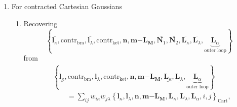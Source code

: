 \documentclass[a4paper,11pt,twoside,openright]{book}
\begin{document}
\begin{enumerate}
\begin{enumerate}
\[          \overline{\boldsymbol{l}_{\lambda}\mathrm{+}\boldsymbol{L}_{\lambda}},%
          \boldsymbol{n},\boldsymbol{m}\mathrm{-}\boldsymbol{L}_{\boldsymbol{M}},%
          \boldsymbol{N}_{1},\boldsymbol{N}_{2},%
          \underbrace{\boldsymbol{L}_{\alpha},i,j}_{\text{outer loop}}\right\}_{\text{Herm}},
        \]
      \item Recovering
        \[
          \left\{\overline{\boldsymbol{l}_{\kappa}},\overline{\boldsymbol{l}_{\lambda}},%
          \boldsymbol{n},\boldsymbol{m}\mathrm{-}\boldsymbol{L}_{\boldsymbol{M}},%
          \overline{\boldsymbol{N}_{1}},\overline{\boldsymbol{N}_{2}},%
          \underbrace{\boldsymbol{L}_{\alpha},i,j}_{\text{outer loop}}\right\}_{\text{Herm}}
        \]
        from
        \[
          \left\{\underline{\boldsymbol{l}_{\kappa}},\underline{\boldsymbol{l}_{\lambda}},%
          \boldsymbol{n},\boldsymbol{m}\mathrm{-}\boldsymbol{L}_{\boldsymbol{M}},%
          \underbrace{\boldsymbol{L}_{\alpha},i,j}_{\text{outer loop}}\right\}_{\text{Herm}};
        \]
    \end{enumerate}
%
  \item For contracted Cartesian Gaussians
    \begin{enumerate}
      \item Recovering
        \[
          \left\{\overline{\boldsymbol{l}_{\kappa}},\text{contr}_{\text{bra}},%
          \overline{\boldsymbol{l}_{\lambda}},\text{contr}_{\text{ket}},%
          \boldsymbol{n},\boldsymbol{m}\mathrm{-}\boldsymbol{L}_{\boldsymbol{M}},%
          \overline{\boldsymbol{N}_{1}},\overline{\boldsymbol{N}_{2}},%
          \overline{\boldsymbol{L}_{\kappa}},\overline{\boldsymbol{L}_{\lambda}},%
          \underbrace{\boldsymbol{L}_{\alpha}}_{\text{outer loop}}\right\}
        \]
        from
        \begin{align}
          &\left\{\underline{\boldsymbol{l}_{\kappa}},\text{contr}_{\text{bra}},%
          \underline{\boldsymbol{l}_{\lambda}},\text{contr}_{\text{ket}},%
          \boldsymbol{n},\boldsymbol{m}\mathrm{-}\boldsymbol{L}_{\boldsymbol{M}},
          \underline{\boldsymbol{L}_{\kappa}},\underline{\boldsymbol{L}_{\lambda}},%
          \underbrace{\boldsymbol{L}_{\alpha}}_{\text{outer loop}}\right\}\nonumber\\
          &\hspace{2em}=\sum_{ij}w_{i\kappa}w_{j\lambda}%
          \left\{\boldsymbol{l}_{\kappa},\boldsymbol{l}_{\lambda},%
          \boldsymbol{n},\boldsymbol{m}\mathrm{-}\boldsymbol{L}_{\boldsymbol{M}},%
          \boldsymbol{L}_{\kappa},\boldsymbol{L}_{\lambda},\boldsymbol{L}_{\alpha},i,j\right\}_{\text{Cart}},\nonumber

\end{align}
\end{enumerate}
\end{enumerate}
\end{document}
